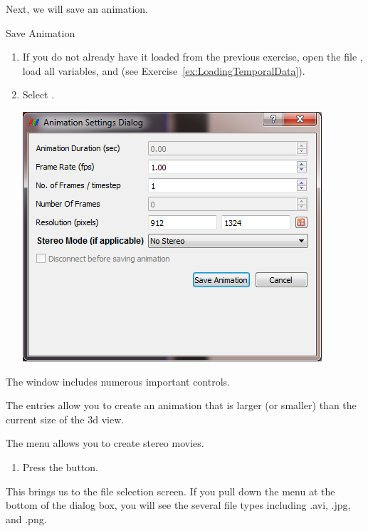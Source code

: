 Next, we will save an animation.

\begin{exercise}{Save Animation}
  \label{ex:SaveAnimation}%
  \begin{enumerate}
  \item If you do not already have it loaded from the previous exercise,
    open the file , load all variables, and \apply (see
    Exercise~\ref{ex:LoadingTemporalData}).

  \item Select  \ra {}.

  \begin{inlinefig}
    \includegraphics[width=\scw]{images/SaveAnimation1}
  \end{inlinefig}

  \savecounter
  \end{enumerate}

  The  window includes numerous important controls.  
  
  The  entries allow you to
  create an animation that is larger (or smaller) than the current size of
  the 3d view. 

  The  menu allows you to create
  stereo movies.
  \begin{enumerate}
    \restorecounter
    \item Press the  button.
    \savecounter
  \end{enumerate}

  This brings us to the file selection screen.  If you pull down the menu
   at the bottom of the dialog box, you will see the
  several file types including .avi, .jpg, and .png.


\end{exercise}
